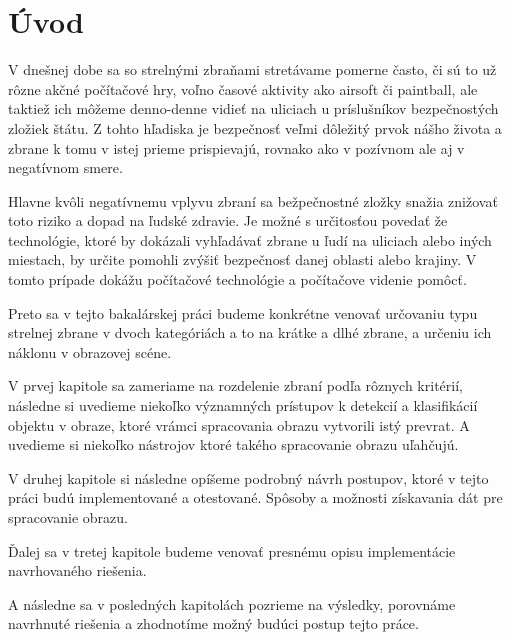 \chapter{Úvod}
V dnešnej dobe sa so strelnými zbraňami stretávame pomerne často, či sú to už rôzne akčné počítačové hry,
    voľno časové aktivity ako airsoft či paintball, ale taktiež ich môžeme denno-denne vidieť na uliciach u príslušníkov bezpečnostých zložiek štátu.
Z tohto hľadiska je bezpečnosť veľmi dôležitý prvok nášho života a zbrane k tomu v istej prieme prispievajú,
    rovnako ako v pozívnom ale aj v negatívnom smere.

Hlavne kvôli negatívnemu vplyvu zbraní sa bežpečnostné zložky snažia znižovať toto riziko a dopad na ľudské zdravie.
Je možné s určitosťou povedať že technológie, ktoré by dokázali vyhľadávať zbrane u ľudí na uliciach alebo iných miestach,
    by určite pomohli zvýšiť bezpečnosť danej oblasti alebo krajiny.
V tomto prípade dokážu počítačové technológie a počítačove videnie pomôcť.

Preto sa v tejto bakalárskej práci budeme konkrétne venovať určovaniu typu strelnej zbrane v dvoch kategóriách a to na
    krátke a dlhé zbrane, a určeniu ich náklonu v obrazovej scéne.

V prvej kapitole sa zameriame na rozdelenie zbraní podľa rôznych kritérií, následne si uvedieme niekoľko
    významných prístupov k detekcií a klasifikácií objektu v obraze, ktoré vrámci spracovania obrazu vytvorili istý prevrat.
A uvedieme si niekoľko nástrojov ktoré takého spracovanie obrazu uľahčujú.

V druhej kapitole si následne opíšeme podrobný návrh postupov, ktoré v tejto práci budú implementované a otestované.
Spôsoby a možnosti získavania dát pre spracovanie obrazu.

Ďalej sa v tretej kapitole budeme venovať presnému opisu implementácie navrhovaného riešenia.

A následne sa v posledných kapitolách pozrieme na výsledky, porovnáme navrhnuté riešenia a zhodnotíme možný budúci postup tejto práce.
